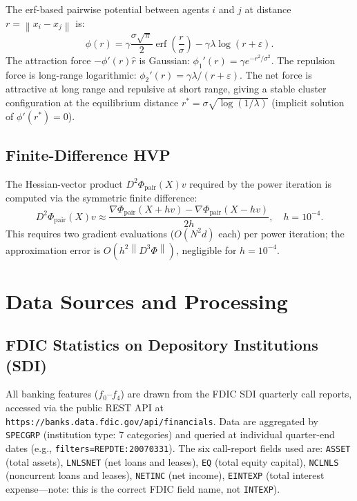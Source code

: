 \documentclass[11pt]{article}
\theoremstyle{definition}
\DeclareMathOperator{\erf}{erf}
\newcommand{\grad}{\nabla}
\newcommand{\norm}[1]{\left\|#1\right\|}
\begin{document}
\begin{appendices}
The erf-based pairwise potential between agents $i$ and $j$ at distance
$r = \norm{x_i - x_j}$ is:
\[
  \phi(r) = \gamma\frac{\sigma\sqrt{\pi}}{2}\erf\!\left(\frac{r}{\sigma}\right)
            - \gamma\lambda\log(r + \varepsilon).
\]
The attraction force $-\phi'(r)\hat r$ is Gaussian: $\phi_1'(r) = \gamma e^{-r^2/\sigma^2}$.
The repulsion force is long-range logarithmic: $\phi_2'(r) = \gamma\lambda/(r+\varepsilon)$.
The net force is attractive at long range and repulsive at short range, giving a
stable cluster configuration at the equilibrium distance
$r^* = \sigma\sqrt{\log(1/\lambda)}$ (implicit solution of $\phi'(r^*) = 0$).

\subsection{Finite-Difference HVP}

The Hessian-vector product $D^2\Phi_{\mathrm{pair}}(X)v$ required by the power
iteration is computed via the symmetric finite difference:
\[
  D^2\Phi_{\mathrm{pair}}(X)v \approx
  \frac{\grad\Phi_{\mathrm{pair}}(X + hv) - \grad\Phi_{\mathrm{pair}}(X - hv)}{2h},
  \quad h = 10^{-4}.
\]
This requires two gradient evaluations ($O(N^2 d)$ each) per power iteration; the
approximation error is $O(h^2\norm{D^3\Phi})$, negligible for $h = 10^{-4}$.

\section{Data Sources and Processing}
\label{app:data}

\subsection{FDIC Statistics on Depository Institutions (SDI)}

All banking features ($f_0$--$f_4$) are drawn from the FDIC SDI quarterly
call reports, accessed via the public REST API at
\texttt{https://banks.data.fdic.gov/api/financials}.
Data are aggregated by \texttt{SPECGRP} (institution type: 7 categories)
and queried at individual quarter-end dates (e.g.,
\texttt{filters=REPDTE:20070331}).  The six call-report fields used are:
\texttt{ASSET} (total assets), \texttt{LNLSNET} (net loans and leases),
\texttt{EQ} (total equity capital), \texttt{NCLNLS} (noncurrent loans and
leases), \texttt{NETINC} (net income), \texttt{EINTEXP} (total interest
expense---note: this is the correct FDIC field name, not \texttt{INTEXP}).


\end{appendices}
\end{document}

